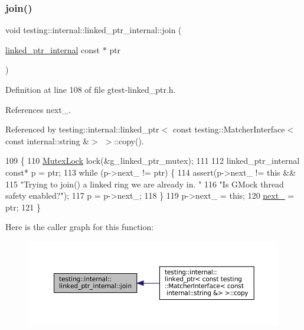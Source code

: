 \subsubsection{\texorpdfstring{join()}{join()}}
{\footnotesize\ttfamily void testing\+::internal\+::linked\+\_\+ptr\+\_\+internal\+::join (\begin{DoxyParamCaption}\item[{\hyperlink{classtesting_1_1internal_1_1linked__ptr__internal}{linked\+\_\+ptr\+\_\+internal} const $\ast$}]{ptr }\end{DoxyParamCaption})\hspace{0.3cm}{\ttfamily [inline]}}



Definition at line 108 of file gtest-\/linked\+\_\+ptr.\+h.



References next\+\_\+.



Referenced by testing\+::internal\+::linked\+\_\+ptr$<$ const testing\+::\+Matcher\+Interface$<$ const internal\+::string \&$>$ $>$\+::copy().


\begin{DoxyCode}
109                                                \{
110     \hyperlink{namespacetesting_1_1internal_a08b187c6cc4e28400aadf9a32fccc8de}{MutexLock} lock(&g\_linked\_ptr\_mutex);
111 
112     linked\_ptr\_internal \textcolor{keyword}{const}* p = ptr;
113     \textcolor{keywordflow}{while} (p->next\_ != ptr) \{
114       assert(p->next\_ != \textcolor{keyword}{this} &&
115              \textcolor{stringliteral}{"Trying to join() a linked ring we are already in. "}
116              \textcolor{stringliteral}{"Is GMock thread safety enabled?"});
117       p = p->next\_;
118     \}
119     p->next\_ = \textcolor{keyword}{this};
120     \hyperlink{classtesting_1_1internal_1_1linked__ptr__internal_ae4397a65a4d76a24547fcf2cd17131d8}{next\_} = ptr;
121   \}
\end{DoxyCode}
Here is the caller graph for this function\+:
\nopagebreak
\begin{figure}[H]
\begin{center}
\leavevmode
\includegraphics[width=350pt]{classtesting_1_1internal_1_1linked__ptr__internal_acd5a341459f7e81b10b4112d8c764e2a_icgraph}
\end{center}
\end{figure}
\mbox{\label{classtesting_1_1internal_1_1linked__ptr__internal_a742af1f65df2d5e2b7198a1b74264a83}} 
